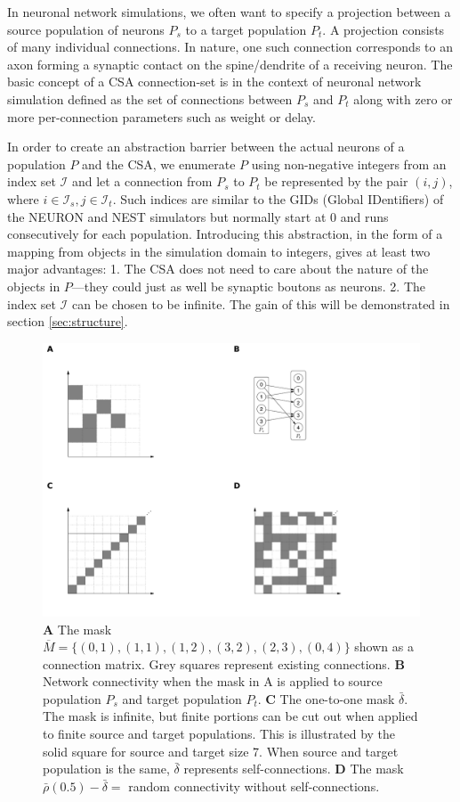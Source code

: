 \documentclass{frontiersSCNS} %
\begin{document}
In neuronal network simulations, we often want to specify a projection
between a source population of neurons $P_s$ to a target population
$P_t$.  A projection consists of many individual connections.  In
nature, one such connection corresponds to an axon forming a synaptic
contact on the spine/dendrite of a receiving neuron.  The basic
concept of a CSA connection-set is in the context of neuronal network
simulation defined as the set of connections between $P_s$ and $P_t$
along with zero or more per-connection parameters such as weight or
delay.

In order to create an abstraction barrier between the actual neurons
of a population $P$ and the CSA, we enumerate $P$ using non-negative
integers from an index set $\mathcal{I}$ and let a connection from
$P_s$ to $P_t$ be represented by the pair $(i, j)$, where $i \in
\mathcal{I}_s, j \in \mathcal{I}_t$.  Such indices are similar to
the GIDs (Global IDentifiers) of the NEURON and NEST simulators but
normally start at 0 and runs consecutively for each population.
Introducing this abstraction, in the form of a mapping from objects in
the simulation domain to integers, gives at least two major
advantages: 1. The CSA does not need to care about the nature of the
objects in $P$---they could just as well be synaptic boutons as neurons.
2. The index set $\mathcal{I}$ can be chosen to be infinite.  The
gain of this will be demonstrated in section \ref{sec:structure}.

\begin{figure}[ht]
\centering
\includegraphics[scale=.7]{figures/csa-pane.pdf}
\caption{
  \textbf{A} The mask $\overline{M} =
  \{(0,1), (1,1), (1,2), (3,2), (2,3), (0,4)\}$ shown as a connection
  matrix. Grey squares represent existing connections.
  \textbf{B} Network connectivity when the mask in A is applied to
  source population $P_s$ and target population
  $P_t$.
  \textbf{C} The one-to-one mask $\bar{\delta}$. The mask is infinite,
  but finite portions can be cut out when applied to finite source and
  target populations. This is illustrated by the solid square for
  source and target size 7. When source and target population is the
  same, $\bar{\delta}$ represents self-connections.
  \textbf{D} The mask $\bar{\rho}(0.5) - \bar{\delta} =$ random
  connectivity without self-connections.
}\label{fig:csa} 
\end{figure}
\end{document}
